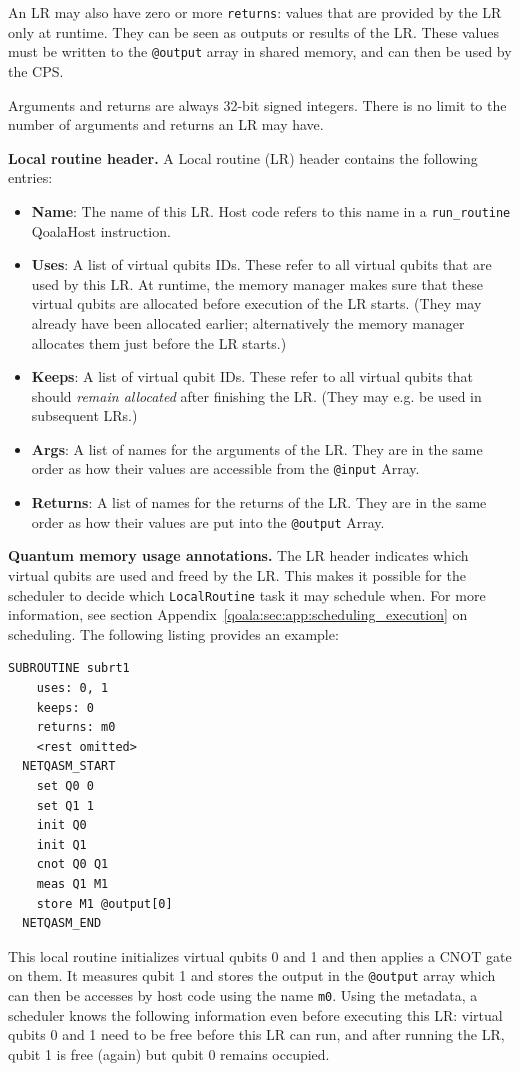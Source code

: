 An LR may also have zero or more \texttt{returns}: values that are provided by the LR only at runtime.
They can be seen as outputs or results of the LR.
These values must be written to the \texttt{@output} array in shared memory, and can then be used by the CPS.

Arguments and returns are always 32-bit signed integers. There is no limit to the number of arguments and returns an LR may have.

\textbf{Local routine header.}
A Local routine (LR) header contains the following entries:
\begin{itemize}
\item \textbf{Name}: The name of this LR. Host code refers to this name in a \texttt{run\_routine} QoalaHost instruction.
\item \textbf{Uses}: A list of virtual qubits IDs. These refer to all virtual qubits that are used by this LR. At runtime, the memory manager makes sure that these virtual qubits are allocated before execution of the LR starts. (They may already have been allocated earlier; alternatively the memory manager allocates them just before the LR starts.)
\item \textbf{Keeps}: A list of virtual qubit IDs. These refer to all virtual qubits that should \textit{remain allocated} after finishing the LR. (They may e.g. be used in subsequent LRs.)
\item \textbf{Args}: A list of names for the arguments of the LR. They are in the same order as how their values are accessible from the \texttt{@input} Array.
\item \textbf{Returns}: A list of names for the returns of the LR. They are in the same order as how their values are put into the \texttt{@output} Array.
\end{itemize}

\textbf{Quantum memory usage annotations.}
The LR header indicates which virtual qubits are used and freed by the LR. This makes it possible for the scheduler to decide which \texttt{LocalRoutine} task it may schedule when. For more information, see section Appendix~\ref{qoala:sec:app:scheduling_execution} on scheduling.
The following listing provides an example:

\begin{lstlisting}
SUBROUTINE subrt1
    uses: 0, 1
    keeps: 0
    returns: m0
    <rest omitted>
  NETQASM_START
    set Q0 0
    set Q1 1
    init Q0
    init Q1
    cnot Q0 Q1
    meas Q1 M1
    store M1 @output[0]
  NETQASM_END
\end{lstlisting}
This local routine initializes virtual qubits 0 and 1 and then applies a CNOT gate on them.
It measures qubit 1 and stores the output in the \texttt{@output} array which can then be accesses by host code using the name \texttt{m0}.
Using the metadata, a scheduler knows the following information even before executing this LR: virtual qubits 0 and 1 need to be free before this LR can run, and after running the LR, qubit 1 is free (again) but qubit 0 remains occupied.

